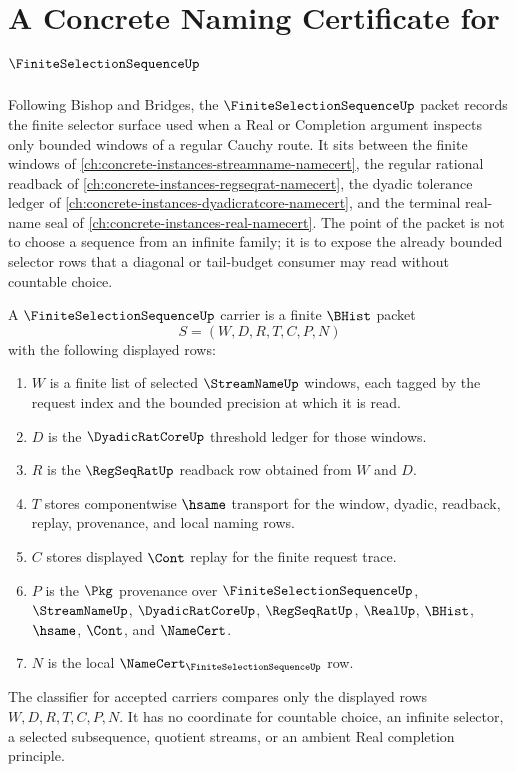 \chapter{A Concrete Naming Certificate for $\FiniteSelectionSequenceUp$}
\label{ch:concrete-instances-finite-selection-sequence-namecert}

Following Bishop and Bridges, the $\FiniteSelectionSequenceUp$ packet records the finite selector surface used when a Real or Completion argument inspects only bounded windows of a regular Cauchy route. It sits between the finite windows of \autoref{ch:concrete-instances-streamname-namecert}, the regular rational readback of \autoref{ch:concrete-instances-regseqrat-namecert}, the dyadic tolerance ledger of \autoref{ch:concrete-instances-dyadicratcore-namecert}, and the terminal real-name seal of \autoref{ch:concrete-instances-real-namecert}. The point of the packet is not to choose a sequence from an infinite family; it is to expose the already bounded selector rows that a diagonal or tail-budget consumer may read without countable choice.

\begin{definition}
\label{def:finite-selection-sequence-carrier}
A $\FiniteSelectionSequenceUp$ carrier is a finite $\BHist$ packet
$$
S=(W,D,R,T,C,P,N)
$$
with the following displayed rows:
\begin{enumerate}
\item $W$ is a finite list of selected $\StreamNameUp$ windows, each tagged by the request index and the bounded precision at which it is read.
\item $D$ is the $\DyadicRatCoreUp$ threshold ledger for those windows.
\item $R$ is the $\RegSeqRatUp$ readback row obtained from $W$ and $D$.
\item $T$ stores componentwise $\hsame$ transport for the window, dyadic, readback, replay, provenance, and local naming rows.
\item $C$ stores displayed $\Cont$ replay for the finite request trace.
\item $P$ is the $\Pkg$ provenance over $\FiniteSelectionSequenceUp$, $\StreamNameUp$, $\DyadicRatCoreUp$, $\RegSeqRatUp$, $\RealUp$, $\BHist$, $\hsame$, $\Cont$, and $\NameCert$.
\item $N$ is the local $\NameCert_{\FiniteSelectionSequenceUp}$ row.
\end{enumerate}
The classifier for accepted carriers compares only the displayed rows $W,D,R,T,C,P,N$. It has no coordinate for countable choice, an infinite selector, a selected subsequence, quotient streams, or an ambient Real completion principle.
\end{definition}

